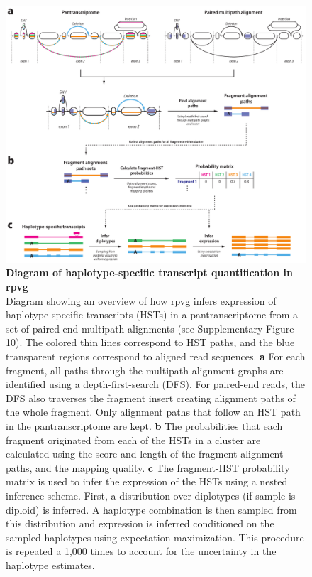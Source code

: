 \documentclass[11pt]{ucthesis}
\begin{document}
\begin{figure}[H]
\begin{center}
\includegraphics[width=\textwidth]{mpmapfigures/figureS11.pdf}
\caption{\textbf{Diagram of haplotype-specific transcript quantification in rpvg
} \\
Diagram showing an overview of how rpvg infers expression of haplotype-specific transcripts (HSTs) in a pantranscriptome from a set of paired-end multipath alignments (see Supplementary Figure 10). The colored thin lines correspond to HST paths, and the blue transparent regions correspond to aligned read sequences. \textbf{a} For each fragment, all paths through the multipath alignment graphs are identified using a depth-first-search (DFS). For paired-end reads, the DFS also traverses the fragment insert creating alignment paths of the whole fragment. Only alignment paths that follow an HST path in the pantranscriptome are kept. \textbf{b} The probabilities that each fragment originated from each of the HSTs in a cluster are calculated using the score and length of the fragment alignment paths, and the mapping quality. \textbf{c} The fragment-HST probability matrix is used to infer the expression of the HSTs using a nested inference scheme. First, a distribution over diplotypes (if sample is diploid) is inferred. A haplotype combination is then sampled from this distribution and expression is inferred conditioned on the sampled haplotypes using expectation-maximization. This procedure is repeated a 1,000 times to account for the uncertainty in the haplotype estimates.
} \label{fig:hst-quantification}
\end{center}
\end{figure}
\end{document}
